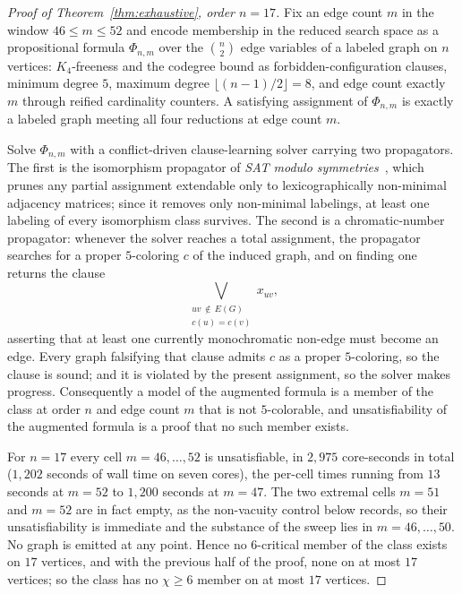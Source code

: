 \documentclass[11pt]{article}
\theoremstyle{definition}
\newcommand{\chrom}{\chi}
\begin{document}
\begin{proof}[Proof of Theorem~\ref{thm:exhaustive}, order $n = 17$]
Fix an edge count $m$ in the window $46 \le m \le 52$ and encode membership in
the reduced search space as a propositional formula $\Phi_{n,m}$ over the
$\binom{n}{2}$ edge variables of a labeled graph on $n$ vertices: $K_4$-freeness
and the codegree bound as forbidden-configuration clauses, minimum degree $5$,
maximum degree $\lfloor (n-1)/2 \rfloor = 8$, and edge count exactly $m$ through
reified cardinality counters. A satisfying assignment of $\Phi_{n,m}$ is exactly a
labeled graph meeting all four reductions at edge count $m$.

Solve $\Phi_{n,m}$ with a conflict-driven clause-learning solver carrying two
propagators. The first is the isomorphism propagator of \emph{SAT modulo
symmetries}~\cite{KirchwegerSzeider2021}, which prunes any partial assignment
extendable only to lexicographically non-minimal adjacency matrices; since it
removes only non-minimal labelings, at least one labeling of every isomorphism
class survives. The second is a chromatic-number propagator: whenever the solver
reaches a total assignment, the propagator searches for a proper $5$-coloring $c$
of the induced graph, and on finding one returns the clause
\[
  \bigvee_{\substack{uv \,\notin\, E(G) \\ c(u) = c(v)}} x_{uv},
\]
asserting that at least one currently monochromatic non-edge must become an edge.
Every graph falsifying that clause admits $c$ as a proper $5$-coloring, so the
clause is sound; and it is violated by the present assignment, so the solver makes
progress. Consequently a model of the augmented formula is a member of the class
at order $n$ and edge count $m$ that is not $5$-colorable, and unsatisfiability of
the augmented formula is a proof that no such member exists.

For $n = 17$ every cell $m = 46, \dots, 52$ is unsatisfiable, in $2{,}975$ core-seconds
in total ($1{,}202$ seconds of wall time on seven cores), the per-cell times running
from $13$ seconds at $m = 52$ to $1{,}200$ seconds at $m = 47$. The two extremal
cells $m = 51$ and $m = 52$ are in fact empty, as the non-vacuity control below
records, so their unsatisfiability is immediate and the substance of the sweep
lies in $m = 46, \dots, 50$. No graph is emitted at any point. Hence no
$6$-critical member of the class exists on $17$ vertices, and with the previous
half of the proof, none on at most $17$ vertices; so the
class has no $\chrom \ge 6$ member on at most $17$ vertices.
\end{proof}
\end{document}
